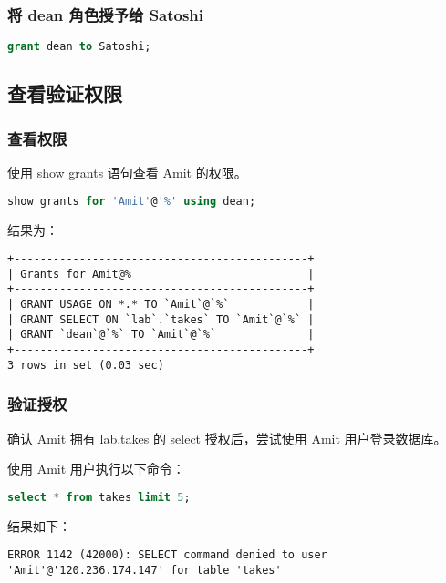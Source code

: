 \documentclass{article}
\begin{document}
\subsubsection{将 dean 角色授予给 Satoshi}

\begin{lstlisting}[language=sql]
grant dean to Satoshi;
\end{lstlisting}

\subsection{查看验证权限}

\subsubsection{查看权限}

使用 show grants 语句查看 Amit 的权限。

\begin{lstlisting}[language=sql]
show grants for 'Amit'@'%' using dean;
\end{lstlisting}

结果为：

\begin{lstlisting}
+---------------------------------------------+
| Grants for Amit@%                           |
+---------------------------------------------+
| GRANT USAGE ON *.* TO `Amit`@`%`            |
| GRANT SELECT ON `lab`.`takes` TO `Amit`@`%` |
| GRANT `dean`@`%` TO `Amit`@`%`              |
+---------------------------------------------+
3 rows in set (0.03 sec)
\end{lstlisting}

\subsubsection{验证授权}

确认 Amit 拥有 lab.takes 的 select 授权后，尝试使用 Amit 用户登录数据库。

使用 Amit 用户执行以下命令：

\begin{lstlisting}[language=sql]
select * from takes limit 5;
\end{lstlisting}

结果如下：

\begin{lstlisting}
ERROR 1142 (42000): SELECT command denied to user 'Amit'@'120.236.174.147' for table 'takes'
\end{lstlisting}
\end{document}
